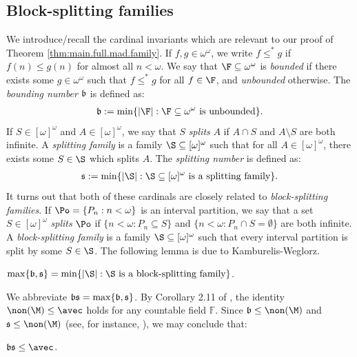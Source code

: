 \documentclass[11pt,reqno]{amsart}
\begin{document}
\subsection{Block-splitting families}
We introduce/recall the cardinal invariants which are relevant to our proof of Theorem \ref{thm:main.full.mad.family}. If $f,g \in \omega^\omega$, we write $f \leq^* g$ if $f(n) \leq g(n)$ for almost all $n < \omega$. We say that $\F \subseteq \omega^\omega$ is \emph{bounded} if there exists some $g \in \omega^\omega$ such that $f \leq^* g$ for all $f \in \F$, and \emph{unbounded} otherwise. The \emph{bounding number} $\frak{b}$ is defined as:
\begin{align*}
    \frak{b} := \min\{|\F| : \F \subseteq \omega^\omega \text{ is unbounded}\}.
\end{align*}
If $S \in [\omega]^\omega$ and $A \in [\omega]^\omega$, we say that $S$ \emph{splits} $A$ if $A \cap S$ and $A \setminus S$ are both infinite. A \emph{splitting family} is a family $\S \subseteq [\omega]^\omega$ such that for all $A \in [\omega]^\omega$, there exists some $S \in \S$ which splits $A$. The \emph{splitting number} is defined as:
\begin{align*}
    \frak{s} := \min\{|\S| : \S \subseteq [\omega]^\omega \text{ is a splitting family}\}.
\end{align*}
It turns out that both of these cardinals are closely related to \emph{block-splitting families}. If $\Po = \{P_n : n < \omega\}$ is an interval partition, we say that a set $S \in [\omega]^\omega$ \emph{splits} $\Po$ if $\{n < \omega : P_n \subseteq S\}$ and $\{n < \omega : P_n \cap S = \emptyset\}$ are both infinite. A \emph{block-splitting family} is a family $\S \subseteq [\omega]^\omega$ such that every interval partition is split by some $S \in \S$. The following lemma is due to Kamburelis-Weglorz.

\begin{lemma}[\cite{KW96}]
    $\max\{\frak{b},\frak{s}\} = \min\{|\S| : \S \text{ is a block-splitting family}\}$.
\end{lemma}

We abbreviate $\frak{bs} = \max\{\frak{b},\frak{s}\}$. By Corollary 2.11 of \cite{S19}, the identity $\non(\M) \leq \avec$ holds for any countable field $\mathbb{F}$. Since $\frak{b} \leq \non(\M)$ and $\frak{s} \leq \non(\M)$ (see, for instance, \cite{blasshandbook}), we may conclude that:

\begin{lemma}
\label{lem:bs.leq.avec}
    $\frak{bs} \leq \avec$.
\end{lemma}
\end{document}
